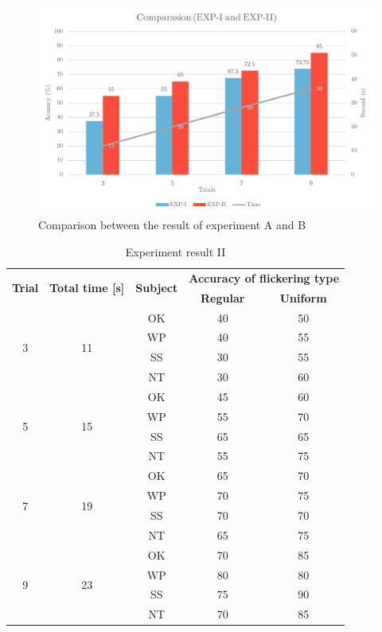 \begin{figure}[ht]
	\centering
	\includegraphics[scale = 0.8]{chapter7/result_12_2.pdf}
	\caption{Comparison between the result of experiment A and B}
    \label{fig:comp2}
\end{figure}

\begin{table}[ht]
\centering
\begin{tabular}{| c | c | c | c | c |}

			\hline 
			\multirow{2}{*}{\textbf{Trial}} & 
  			\multirow{2}{*}{\textbf{Total time [s]}}  & 
            \multirow{2}{*}{\textbf{Subject}} &
            \multicolumn{2}{c|}{\textbf{Accuracy of flickering type}} \\
            \cline{4-5}
            &&&\multicolumn{1}{c|}{\textbf{Regular}} &\multicolumn{1}{c|}{\textbf{Uniform}}  \\
			\hline 
			\multirow{4}{*}{3}&\multirow{4}{*}{11}&OK&40&50 \\
			\cline{3-5}
			&&WP&40&55 \\ \cline{3-5}
			&&SS&30&55 \\ \cline{3-5}
			&&NT&30&60 \\
            \hline
			\multirow{4}{*}{5}&\multirow{4}{*}{15}&OK&45&60 \\
			\cline{3-5}
			&&WP&55&70 \\ \cline{3-5}
			&&SS&65&65 \\ \cline{3-5}
			&&NT&55&75 \\
            \hline
            \multirow{4}{*}{7}&\multirow{4}{*}{19}&OK&65&70 \\
			\cline{3-5}
			&&WP&70&75 \\ \cline{3-5}
			&&SS&70&70 \\ \cline{3-5}
			&&NT&65&75 \\
            \hline 
            \multirow{4}{*}{9}&\multirow{4}{*}{23}&OK&70&85 \\
			\cline{3-5}
			&&WP&80&80 \\ \cline{3-5}
			&&SS&75&90 \\ \cline{3-5}
			&&NT&70&85 \\
            \hline 
		\end{tabular}       
\caption{Experiment result II}
\label{table:result2}
\end{table}

